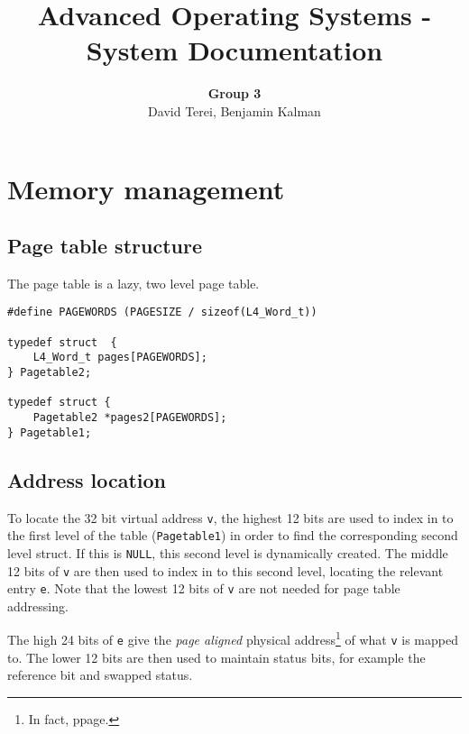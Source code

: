 \documentclass[12pt,english]{article}
\begin{document}

\title{Advanced Operating Systems - System Documentation}
\author{\textbf{Group 3} \\ David Terei, Benjamin Kalman}
\maketitle

\tableofcontents{}


\newpage{}
\section{Memory management}

\subsection{Page table structure}

The page table is a lazy, two level page table.  

\begin{verbatim}
#define PAGEWORDS (PAGESIZE / sizeof(L4_Word_t))

typedef struct  {
    L4_Word_t pages[PAGEWORDS];
} Pagetable2;

typedef struct {
    Pagetable2 *pages2[PAGEWORDS];
} Pagetable1;
\end{verbatim}

\subsection{Address location}

To locate the 32 bit virtual address \texttt{v}, the highest 12 bits are used to index in to the first level of the table (\texttt{Pagetable1}) in order to find the corresponding second level struct.  If this is \texttt{NULL}, this second level is dynamically created.  The middle 12 bits of \texttt{v} are then used to index in to this second level, locating the relevant entry \texttt{e}.  Note that the lowest 12 bits of \texttt{v} are not needed for page table addressing.

The high 24 bits of \texttt{e} give the \emph{page aligned} physical address\footnote{In fact, ppage.} of what \texttt{v} is mapped to.  The lower 12 bits are then used to maintain status bits, for example the reference bit and swapped status.
\end{document}
